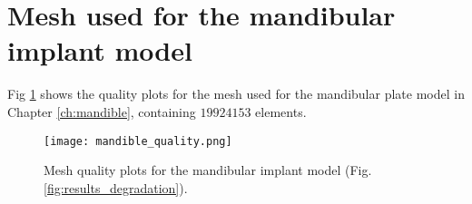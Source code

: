 \section{Mesh used for the mandibular implant model}

Fig \ref{fig:appendix_mandible} shows the quality plots for the mesh used for the mandibular plate model in Chapter \ref{ch:mandible}, containing $\num{19924153}$ elements.

\begin{figure}[h]
\centering
\medskip
\texttt{[image: mandible\_quality.png]}
\caption[Mesh quality plots for the mandibular implant model]{Mesh quality plots for the mandibular implant model (Fig. \ref{fig:results_degradation}).} \label{fig:appendix_mandible}
\end{figure}

\cleardoublepage

